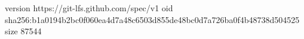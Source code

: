 version https://git-lfs.github.com/spec/v1
oid sha256:b1a0194b2bc0f060ea4d7a48c6503d855de48bc0d7a726ba0f4b48738d504525
size 87544

